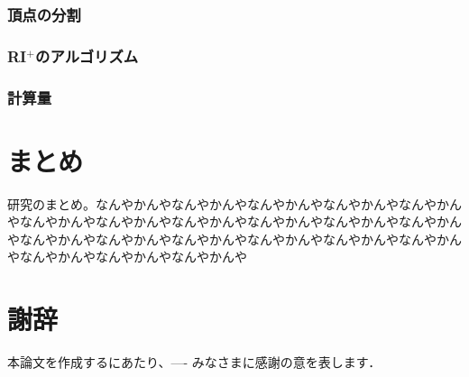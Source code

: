 \documentclass[11pt,a4j]{jsreport}
\newcommand{\riplus}{RI${}^\text{+}$}
\begin{document}
\subsection{頂点の分割}
\subsection{\riplus のアルゴリズム}
\subsection{計算量}

\chapter{まとめ}
研究のまとめ。なんやかんやなんやかんやなんやかんやなんやかんやなんやかんやなんやかんやなんやかんやなんやかんやなんやかんやなんやかんやなんやかんやなんやかんやなんやかんやなんやかんやなんやかんやなんやかんやなんやかんやなんやかんやなんやかんやなんやかんや

\chapter*{謝辞} %
本論文を作成するにあたり、---- みなさまに感謝の意を表します．


\renewcommand{\bibname}{参考文献} %
\cite{keg}
\cite{ck3}
\end{document}
